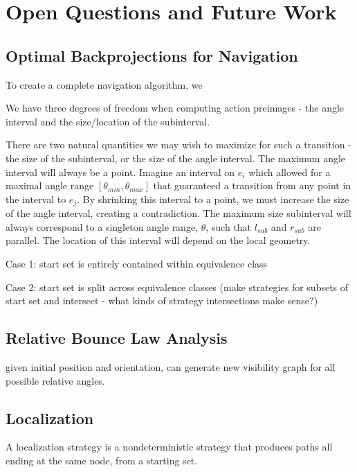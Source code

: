 \documentclass[]{styles/svproc}  %
\begin{document}
\section{Open Questions and Future Work}

\subsection{Optimal Backprojections for Navigation}

To create a complete navigation algorithm, we 

We have three degrees of freedom when computing action preimages - the angle
interval and the size/location of the subinterval.

There are two natural quantities we may wish to maximize for such a transition -
the size of the subinterval, or the size of the angle interval.
The maximum angle interval will always be a point. Imagine an interval on $e_i$
which allowed for a maximal angle range $[\theta_{min}, \theta_{max}]$ that
guaranteed a transition from any point in the interval to $e_j$. By
shrinking this interval to a point, we must increase the size of the angle
interval, creating a contradiction. The maximum size subinterval will always correspond to a singleton angle range,
$\theta$, such that $l_{sub}$ and $r_{sub}$ are parallel. The location of this
interval will depend on the local geometry.

Case 1: start set is entirely contained within equivalence class

Case 2: start set is split across equivalence classes (make strategies for
subsets of start set and intersect - what kinds of strategy intersections make
sense?)

\subsection{Relative Bounce Law Analysis}

given initial position and orientation, can generate new visibility graph for
all possible relative angles.


\subsection{Localization}

\begin{definition}
A localization strategy is a nondeterministic strategy that produces paths all
ending at the same node, from a starting set.
\end{definition}
\end{document}
